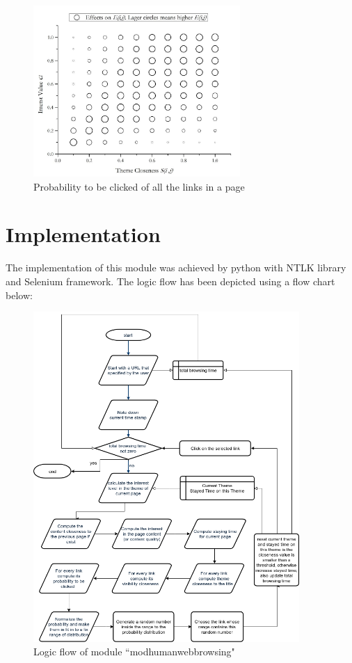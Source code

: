\documentclass[12pt]{report}
\begin{document}
\begin{figure}[h!]
  \centering
  \includegraphics[width=0.7\textwidth]{./pictures/prob-link}
  \caption{Probability to be clicked of all the links in a page}
\end{figure}

\section{Implementation}
The implementation of this module was achieved by python with NTLK library and Selenium framework. The logic flow has been depicted using a flow chart below:

\begin{figure}[h!]
  \centering
  \includegraphics[width=0.9\textwidth]{./pictures/hbs-flow}
  \caption{Logic flow of module ``mod\textunderscore human\textunderscore web\textunderscore browsing"}
\end{figure}
\end{document}
